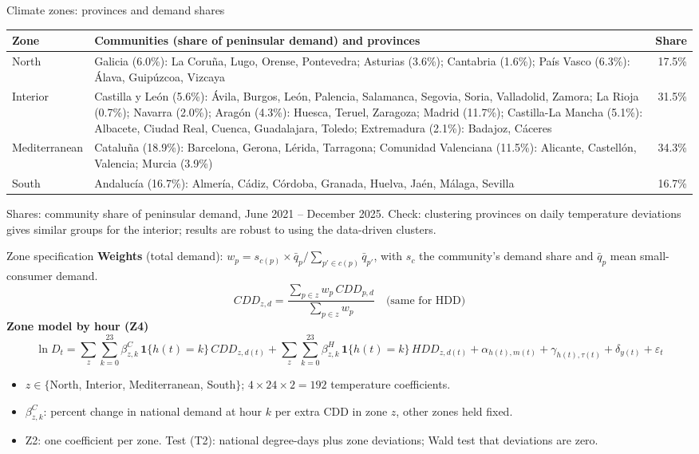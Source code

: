\documentclass[aspectratio=169,11pt]{beamer}
\newcommand{\ind}{\mathbf{1}}
\begin{document}
\begin{frame}{Climate zones: provinces and demand shares}
  \scriptsize
  \begin{tabular}{@{}l>{\raggedright\arraybackslash}p{9.9cm}r@{}}
    \toprule
    Zone & Communities (share of peninsular demand) and provinces & Share \\
    \midrule
    North & Galicia (6.0\%): La Coruña, Lugo, Orense, Pontevedra;
            Asturias (3.6\%); Cantabria (1.6\%);
            País Vasco (6.3\%): Álava, Guipúzcoa, Vizcaya & 17.5\% \\[2pt]
    Interior & Castilla y León (5.6\%): Ávila, Burgos, León, Palencia, Salamanca,
               Segovia, Soria, Valladolid, Zamora; La Rioja (0.7\%); Navarra (2.0\%);
               Aragón (4.3\%): Huesca, Teruel, Zaragoza; Madrid (11.7\%);
               Castilla-La Mancha (5.1\%): Albacete, Ciudad Real, Cuenca, Guadalajara, Toledo;
               Extremadura (2.1\%): Badajoz, Cáceres & 31.5\% \\[2pt]
    Mediterranean & Cataluña (18.9\%): Barcelona, Gerona, Lérida, Tarragona;
                    Comunidad Valenciana (11.5\%): Alicante, Castellón, Valencia;
                    Murcia (3.9\%) & 34.3\% \\[2pt]
    South & Andalucía (16.7\%): Almería, Cádiz, Córdoba, Granada, Huelva, Jaén,
            Málaga, Sevilla & 16.7\% \\
    \bottomrule
  \end{tabular}
  \vspace{4pt}

  \raggedright
  Shares: community share of peninsular demand, June 2021 -- December 2025.
  Check: clustering provinces on daily temperature deviations gives similar groups
  for the interior; results are robust to using the data-driven clusters.
\end{frame}

\begin{frame}{Zone specification}
  \textbf{Weights} (total demand):
  $w_p = s_{c(p)} \times \bar{q}_p / \sum_{p' \in c(p)} \bar{q}_{p'}$,
  with $s_c$ the community's demand share and $\bar{q}_p$ mean small-consumer demand.
  \[
    CDD_{z,d} = \frac{\sum_{p \in z} w_p\, CDD_{p,d}}{\sum_{p \in z} w_p}
    \quad\text{(same for HDD)}
  \]
  \textbf{Zone model by hour (Z4)}
  \[
    \ln D_t = \sum_{z}\sum_{k=0}^{23} \beta^{C}_{z,k}\, \ind\{h(t)=k\}\, CDD_{z,d(t)}
      + \sum_{z}\sum_{k=0}^{23} \beta^{H}_{z,k}\, \ind\{h(t)=k\}\, HDD_{z,d(t)}
      + \alpha_{h(t),m(t)} + \gamma_{h(t),\tau(t)} + \delta_{y(t)} + \varepsilon_t
  \]
  \begin{itemize}\small
    \item $z \in \{$North, Interior, Mediterranean, South$\}$; $4 \times 24 \times 2 = 192$
          temperature coefficients.
    \item $\beta^{C}_{z,k}$: percent change in national demand at hour $k$ per extra CDD
          in zone $z$, other zones held fixed.
    \item Z2: one coefficient per zone. Test (T2): national degree-days plus zone
          deviations; Wald test that deviations are zero.
  \end{itemize}
\end{frame}
\end{document}
